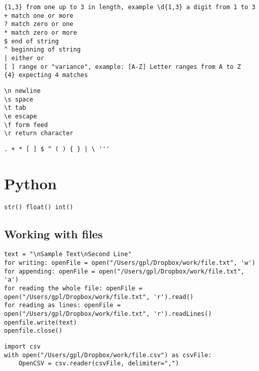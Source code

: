 \documentclass[12pt,a4paper]{report}
\begin{document}
\begin{lstlisting}
{1,3} from one up to 3 in length, example \d{1,3} a digit from 1 to 3
+ match one or more
? match zero or one
* match zero or more
$ end of string
^ beginning of string
| either or
[ ] range or "variance", example: [A-Z] Letter ranges from A to Z
{4} expecting 4 matches
\end{lstlisting}

\begin{lstlisting}
\n newline
\s space
\t tab
\e escape
\f form feed
\r return character
\end{lstlisting}


\begin{lstlisting}
. + * [ ] $ ^ ( ) { } | \ '''
\end{lstlisting}


\newpage
\vspace*{40pt}
{\color{Magenta} \section{Python}}

\begin{lstlisting}
str() float() int()
\end{lstlisting}


\vspace*{20pt}
{\color{WildStrawberry} \subsection*{Working with files}}
\begin{lstlisting}
text = "\nSample Text\nSecond Line"
for writing: openFile = open("/Users/gpl/Dropbox/work/file.txt", 'w')
for appending: openFile = open("/Users/gpl/Dropbox/work/file.txt", 'a')
for reading the whole file: openFile = open("/Users/gpl/Dropbox/work/file.txt", 'r').read()
for reading as lines: openFile = open("/Users/gpl/Dropbox/work/file.txt", 'r').readLines()
openfile.write(text)
openfile.close()
\end{lstlisting}

\begin{lstlisting}
import csv
with open("/Users/gpl/Dropbox/work/file.csv") as csvFile:
    OpenCSV = csv.reader(csvFile, delimiter=",")
    
\end{lstlisting}
\end{document}
